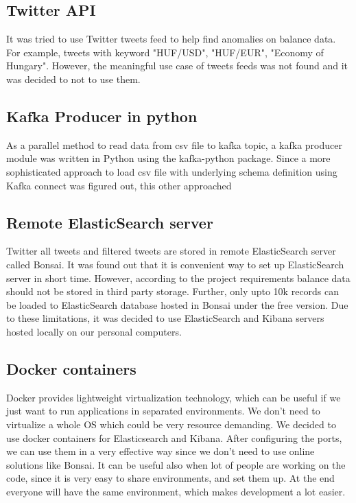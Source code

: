 \documentclass{article}
\begin{document}
\subsection{Twitter API}

It was tried to use Twitter tweets feed to help find anomalies on balance data. For example, tweets with keyword "HUF/USD", "HUF/EUR", "Economy of Hungary". However, the meaningful use case of tweets feeds was not found and it was decided to not to use them.

\subsection{Kafka Producer in python}

As a parallel method to read data from csv file to kafka topic, a kafka producer module was written in Python using the kafka-python package. Since a more sophisticated approach to load csv file with underlying schema definition using Kafka connect was figured out, this other approached

\subsection{Remote ElasticSearch server}

Twitter all tweets and filtered tweets are stored in remote ElasticSearch server called Bonsai. It was found out that it is convenient way to set up ElasticSearch server in short time. However, according to the project requirements balance data should not be stored in third party storage. Further, only upto 10k records can be loaded to ElasticSearch database hosted in Bonsai under the free version. Due to these limitations, it was decided to use ElasticSearch and Kibana servers hosted locally on our personal computers.

\subsection{Docker containers}

Docker provides lightweight virtualization technology, which can be useful if we just want to run applications in separated environments. We don't need to virtualize a whole OS which could be very resource demanding. We decided to use docker containers for Elasticsearch and Kibana. After configuring the ports, we can use them in a very effective way since we don't need to use online solutions like Bonsai. It can be useful also when lot of people are working on the code, since it is very easy to share environments, and set them up. At the end everyone will have the same environment, which makes development a lot easier.
\end{document}
